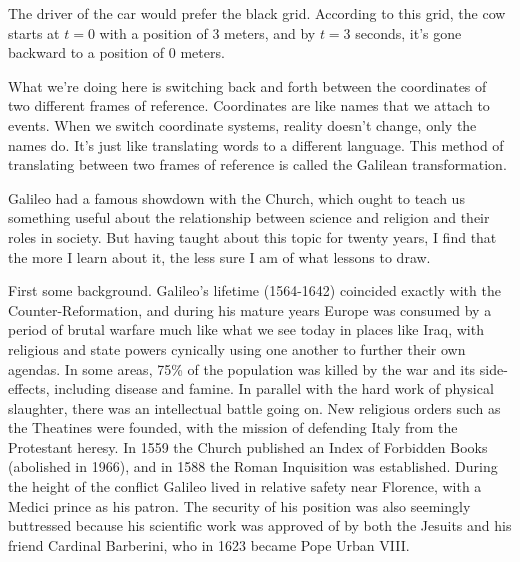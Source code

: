 The driver of the car would prefer the black grid. According to this grid, the cow starts at $t=0$
with a position of 3 meters, and by $t=3$ seconds, it's gone backward to a position of 0 meters.

What we're doing here is switching back and forth between the coordinates of two different frames
of reference. Coordinates are like names that we attach to events. When we switch coordinate systems,
reality doesn't change, only the names do. It's just like translating words to a different language.
This method of translating between two frames of reference is called the Galilean transformation.

\pagebreak


Galileo had a famous showdown with the Church, which ought to teach us something useful about
the relationship between science and religion and their roles in society. But having taught
about this topic for twenty years, I find that the more I learn about it, the less sure I am
of what lessons to draw.

First some background. Galileo's lifetime (1564-1642) coincided exactly
with the Counter-Reformation, and during his mature years Europe was consumed by a period
of brutal warfare much like what we see today in places like Iraq, with religious and state
powers cynically using one another to further their own agendas. In some areas, 75\% of
the population was killed by the war and its side-effects, including disease and famine.
In parallel with the hard work of physical slaughter, there was an intellectual battle going on.
New religious orders such as the Theatines were founded, with the mission of defending Italy from
the Protestant heresy. In 1559 the Church published an
Index of Forbidden Books (abolished in 1966), and in 1588 the Roman Inquisition was established.
During the height of the conflict Galileo lived in relative safety near Florence, with a Medici prince as his patron.
The security of his position was also seemingly buttressed because his scientific work was approved of by both
the Jesuits and his friend Cardinal Barberini, who in 1623 became Pope Urban VIII.

